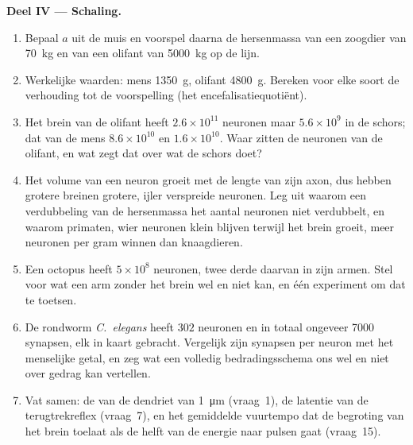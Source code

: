 \begin{problem}
\medskip
\noindent\textbf{Deel IV --- Schaling.}
\begin{enumerate}[resume]
  \item Bepaal $a$ uit de muis en voorspel daarna de hersenmassa van
        een zoogdier van \qty{70}{kg} en van een olifant van
        \qty{5000}{kg} op de lijn.
  \item Werkelijke waarden: mens \qty{1350}{g}, olifant \qty{4800}{g}.
        Bereken voor elke soort de verhouding tot de voorspelling (het
        encefalisatiequotiënt).
  \item Het brein van de olifant heeft $2.6\times 10^{11}$ neuronen
        maar $5.6\times 10^{9}$ in de schors; dat van de mens
        $8.6\times 10^{10}$ en $1.6\times 10^{10}$. Waar zitten de
        neuronen van de olifant, en wat zegt dat over wat de schors
        doet?
  \item Het volume van een neuron groeit met de lengte van zijn axon,
        dus hebben grotere breinen grotere, ijler verspreide neuronen.
        Leg uit waarom een verdubbeling van de hersenmassa het aantal
        neuronen niet verdubbelt, en waarom primaten, wier neuronen
        klein blijven terwijl het brein groeit, meer neuronen per gram
        winnen dan knaagdieren.
  \item Een octopus heeft $5\times 10^{8}$ neuronen, twee derde daarvan
        in zijn armen. Stel voor wat een arm zonder het brein wel en
        niet kan, en één experiment om dat te toetsen.
  \item De rondworm \emph{C.~elegans} heeft $302$ neuronen en in totaal
        ongeveer \num{7000} synapsen, elk in kaart gebracht. Vergelijk
        zijn synapsen per neuron met het menselijke getal, en zeg wat
        een volledig bedradingsschema ons wel en niet over gedrag kan
        vertellen.
  \item Vat samen: de  van de dendriet van
        \qty{1}{\micro m} (vraag~1), de latentie van de terugtrekreflex
        (vraag~7), en het gemiddelde vuurtempo dat de begroting van het
        brein toelaat als de helft van de energie naar pulsen gaat
        (vraag~15).
\end{enumerate}
\end{problem}
